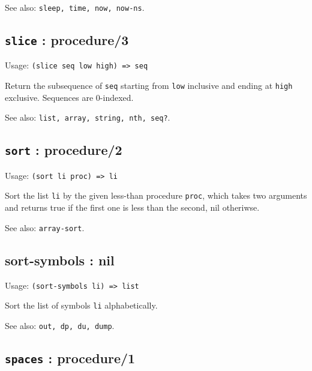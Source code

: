 \documentclass[
]{article}
\newcommand{\passthrough}[1]{#1}
\begin{document}
See also: \passthrough{\lstinline!sleep, time, now, now-ns!}.

\hypertarget{slice-procedure3-1}{%
\subsection{\texorpdfstring{\texttt{slice} :
procedure/3}{slice : procedure/3}}\label{slice-procedure3-1}}

Usage: \passthrough{\lstinline!(slice seq low high) => seq!}

Return the subsequence of \passthrough{\lstinline!seq!} starting from
\passthrough{\lstinline!low!} inclusive and ending at
\passthrough{\lstinline!high!} exclusive. Sequences are 0-indexed.

See also: \passthrough{\lstinline!list, array, string, nth, seq?!}.

\hypertarget{sort-procedure2-1}{%
\subsection{\texorpdfstring{\texttt{sort} :
procedure/2}{sort : procedure/2}}\label{sort-procedure2-1}}

Usage: \passthrough{\lstinline!(sort li proc) => li!}

Sort the list \passthrough{\lstinline!li!} by the given less-than
procedure \passthrough{\lstinline!proc!}, which takes two arguments and
returns true if the first one is less than the second, nil otheriwse.

See also: \passthrough{\lstinline!array-sort!}.

\hypertarget{sort-symbols-nil-1}{%
\subsection{sort-symbols : nil}\label{sort-symbols-nil-1}}

Usage: \passthrough{\lstinline!(sort-symbols li) => list!}

Sort the list of symbols \passthrough{\lstinline!li!} alphabetically.

See also: \passthrough{\lstinline!out, dp, du, dump!}.

\hypertarget{spaces-procedure1-1}{%
\subsection{\texorpdfstring{\texttt{spaces} :
procedure/1}{spaces : procedure/1}}\label{spaces-procedure1-1}}
\end{document}
